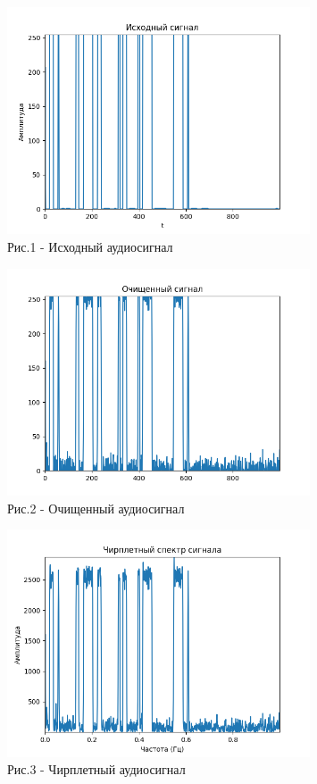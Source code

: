 \begin{figure}[H]
	\centering
	\includegraphics[width=0.8\textwidth]{media/ict/image64}
	\caption*{Рис.1 - Исходный аудиосигнал}
\end{figure}

\begin{figure}[H]
	\centering
	\includegraphics[width=0.8\textwidth]{media/ict/image65}
	\caption*{Рис.2 - Очищенный аудиосигнал}
\end{figure}

\begin{figure}[H]
	\centering
	\includegraphics[width=0.8\textwidth]{media/ict/image66}
	\caption*{Рис.3 - Чирплетный аудиосигнал}
\end{figure}

